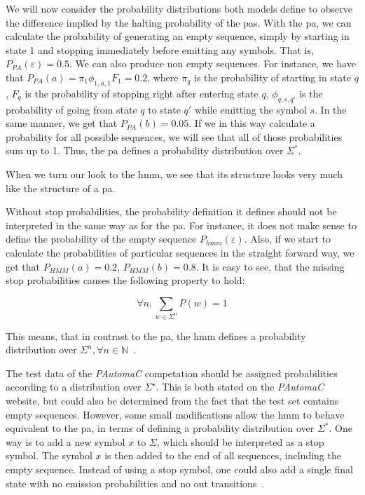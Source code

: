 We will now consider the probability distributions both models define to observe the difference implied by the halting probability of the \glspl{pa}.
With the \gls{pa}, we can calculate the probability of generating an empty sequence, simply by starting in state 1 and stopping immediately before emitting any symbols. That is, $P_{PA}(\varepsilon) = 0.5$. We can also produce non empty sequences. For instance, we have that $P_{PA}(a) = \pi_1\phi_{1,a,1}F_1 = 0.2$, where $\pi_q$ is the probability of starting in state $q$, $F_q$ is the probability of stopping right after entering state $q$, $\phi_{q,s,q'}$ is the probability of going from state $q$ to state $q'$ while emitting the symbol $s$.
In the same manner, we get that $P_{PA}(b) = 0.05$.
If we in this way calculate a probability for all possible sequences, we will see that all of those probabilities sum up to 1. Thus, the \gls{pa} defines a probability distribution over $\Sigma^\ast$\cite{Dupont:2005:LPA:1746577.1746601}.

When we turn our look to the \gls{hmm}, we see that its structure looks very much like the structure of a \gls{pa}.

Without stop probabilities, the probability definition it defines should not be interpreted in the same way as for the \gls{pa}. For instance, it does not make sense to define the probability of the empty sequence $P_{hmm}(\varepsilon)$. Also, if we start to calculate the probabilities of particular sequences in the straight forward way, we get that $P_{HMM}(a) = 0.2$, $P_{HMM}(b) = 0.8$. It is easy to see, that the missing stop probabilities causes the following property to hold:

\[\forall n, \sum_{w \in \Sigma^n} P(w) = 1\]

This means, that in contrast to the \gls{pa}, the \gls{hmm} defines a probability distribution over $\Sigma^n, \forall n \in \mathbb{N}$~\cite{Dupont:2005:LPA:1746577.1746601}.

The test data of the \emph{PAutomaC} competation should be assigned probabilities according to a distribution over $\Sigma^\star$.
This is both stated on the \emph{PAutomaC} website, but could also be determined from the fact that the test set contains empty sequences. However, some small modifications allow the \gls{hmm} to behave equivalent to the \gls{pa}, in terms of defining a probability distribution over $\Sigma^\ast$. One way is to add a new symbol $x$ to $\Sigma$, which should be interpreted as a stop symbol. The symbol $x$ is then added to the end of all sequences, including the empty sequence. Instead of using a stop symbol, one could also add a single final state with no emission probabilities and no out transitions~\cite{Dupont:2005:LPA:1746577.1746601}.
